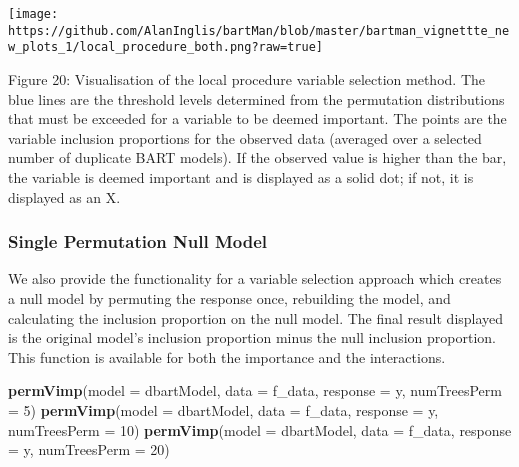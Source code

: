 \documentclass[
]{article}
\newenvironment{Shaded}{\begin{snugshade}}{\end{snugshade}}
\newcommand{\AttributeTok}[1]{\textcolor[rgb]{0.13,0.29,0.53}{#1}}
\newcommand{\DecValTok}[1]{\textcolor[rgb]{0.00,0.00,0.81}{#1}}
\newcommand{\FunctionTok}[1]{\textcolor[rgb]{0.13,0.29,0.53}{\textbf{#1}}}
\newcommand{\NormalTok}[1]{#1}
\newcommand{\StringTok}[1]{\textcolor[rgb]{0.31,0.60,0.02}{#1}}
\begin{document}
\begin{center}\texttt{[image: https://github.com/AlanInglis/bartMan/blob/master/bartman\_vignettte\_new\_plots\_1/local\_procedure\_both.png?raw=true]} \end{center}

\protect\hypertarget{fig20:fig20}{}{Figure 20: } Visualisation of the
local procedure variable selection method. The blue lines are the
threshold levels determined from the permutation distributions that must
be exceeded for a variable to be deemed important. The points are the
variable inclusion proportions for the observed data (averaged over a
selected number of duplicate BART models). If the observed value is
higher than the bar, the variable is deemed important and is displayed
as a solid dot; if not, it is displayed as an X.

\hypertarget{single-permutation-null-model}{%
\subsubsection{Single Permutation Null
Model}\label{single-permutation-null-model}}

We also provide the functionality for a variable selection approach
which creates a null model by permuting the response once, rebuilding
the model, and calculating the inclusion proportion on the null model.
The final result displayed is the original model's inclusion proportion
minus the null inclusion proportion. This function is available for both
the importance and the interactions.

\begin{Shaded}
\begin{Highlighting}[]
\FunctionTok{permVimp}\NormalTok{(}\AttributeTok{model =}\NormalTok{ dbartModel, }\AttributeTok{data =}\NormalTok{ f\_data, }\AttributeTok{response =} \StringTok{\textquotesingle{}y\textquotesingle{}}\NormalTok{,  }\AttributeTok{numTreesPerm =} \DecValTok{5}\NormalTok{)}
\FunctionTok{permVimp}\NormalTok{(}\AttributeTok{model =}\NormalTok{ dbartModel, }\AttributeTok{data =}\NormalTok{ f\_data, }\AttributeTok{response =} \StringTok{\textquotesingle{}y\textquotesingle{}}\NormalTok{,  }\AttributeTok{numTreesPerm =} \DecValTok{10}\NormalTok{)}
\FunctionTok{permVimp}\NormalTok{(}\AttributeTok{model =}\NormalTok{ dbartModel, }\AttributeTok{data =}\NormalTok{ f\_data, }\AttributeTok{response =} \StringTok{\textquotesingle{}y\textquotesingle{}}\NormalTok{,  }\AttributeTok{numTreesPerm =} \DecValTok{20}\NormalTok{)}
\end{Highlighting}
\end{Shaded}
\end{document}
